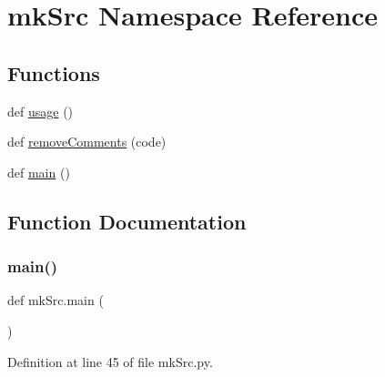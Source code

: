 \hypertarget{namespacemkSrc}{}\section{mk\+Src Namespace Reference}
\label{namespacemkSrc}
\subsection*{Functions}
\begin{DoxyCompactItemize}
\item 
def \hyperlink{namespacemkSrc_a2912f80b0972d6bef1ca6d6bd8dd97f8}{usage} ()
\item 
def \hyperlink{namespacemkSrc_a2295e28381950f839d54f2db1af19d21}{remove\+Comments} (code)
\item 
def \hyperlink{namespacemkSrc_a397eab54ba44c6e689aba237b2f0ef0a}{main} ()
\end{DoxyCompactItemize}


\subsection{Function Documentation}
\mbox{\label{namespacemkSrc_a397eab54ba44c6e689aba237b2f0ef0a}} 
\subsubsection{\texorpdfstring{main()}{main()}}
{\footnotesize\ttfamily def mk\+Src.\+main (\begin{DoxyParamCaption}{ }\end{DoxyParamCaption})}



Definition at line 45 of file mk\+Src.\+py.


